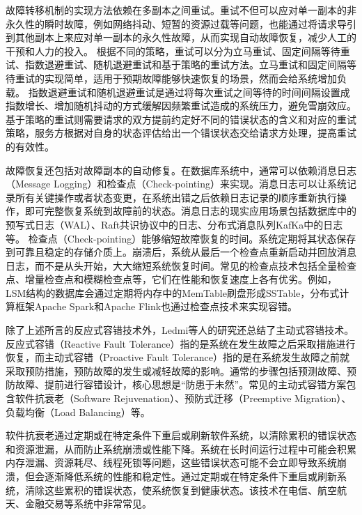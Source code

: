 故障转移机制的实现方法依赖在多副本之间重试。重试不但可以应对单一副本的非永久性的瞬时故障，例如网络抖动、短暂的资源过载等问题，也能通过将请求导引到其他副本上来应对单一副本的永久性故障，从而实现自动故障恢复，减少人工的干预和人力的投入。
根据不同的策略，重试可以分为立马重试、固定间隔等待重试、指数退避重试、随机退避重试和基于策略的重试方法。立马重试和固定间隔等待重试的实现简单，适用于预期故障能够快速恢复的场景，然而会给系统增加负载。
指数退避重试和随机退避重试是通过将每次重试之间等待的时间间隔设置成指数增长、增加随机抖动的方式缓解因频繁重试造成的系统压力，避免雪崩效应。基于策略的重试则需要请求的双方提前约定好不同的错误状态的含义和对应的重试策略，服务方根据对自身的状态评估给出一个错误状态交给请求方处理，提高重试的有效性。

故障恢复还包括对故障副本的自动修复。在数据库系统中，通常可以依赖消息日志（Message Logging）和检查点（Check-pointing）来实现。消息日志可以让系统记录所有关键操作或者状态变更，在系统出错之后依赖日志记录的顺序重新执行操作，即可完整恢复系统到故障前的状态。消息日志的现实应用场景包括数据库中的预写式日志（WAL）、Raft共识协议中的日志、分布式消息队列KafKa中的日志等。
检查点（Check-pointing）能够缩短故障恢复的时间。系统定期将其状态保存到可靠且稳定的存储介质上。崩溃后，系统从最后一个检查点重新启动并回放消息日志，而不是从头开始，大大缩短系统恢复时间。常见的检查点技术包括全量检查点、增量检查点和模糊检查点等，它们在性能和恢复速度上各有优劣。例如，LSM结构\cite{o1996lsmtree}的数据库会通过定期将内存中的MemTable刷盘形成SSTable，分布式计算框架Apache Spark\cite{zaharia2016spark}和Apache Flink\cite{carbone2015flink}也通过检查点技术来实现容错。


除了上述所言的反应式容错技术外，Ledmi\cite{ledmi2018fault}等人的研究还总结了主动式容错技术。
反应式容错（Reactive Fault Tolerance）指的是系统在发生故障之后采取措施进行恢复，而主动式容错（Proactive Fault Tolerance）指的是在系统发生故障之前就采取预防措施，预防故障的发生或减轻故障的影响。通常的步骤包括预测故障、预防故障、提前进行容错设计，核心思想是“防患于未然”。常见的主动式容错方案包含软件抗衰老（Software Rejuvenation）、预防式迁移（Preemptive Migration）、负载均衡（Load Balancing）等。

软件抗衰老通过定期或在特定条件下重启或刷新软件系统，以清除累积的错误状态和资源泄漏，从而防止系统崩溃或性能下降。系统在长时间运行过程中可能会积累内存泄漏、资源耗尽、线程死锁等问题，这些错误状态可能不会立即导致系统崩溃，但会逐渐降低系统的性能和稳定性。通过定期或在特定条件下重启或刷新系统，清除这些累积的错误状态，使系统恢复到健康状态。该技术在电信、航空航天、金融交易等系统中非常常见。

